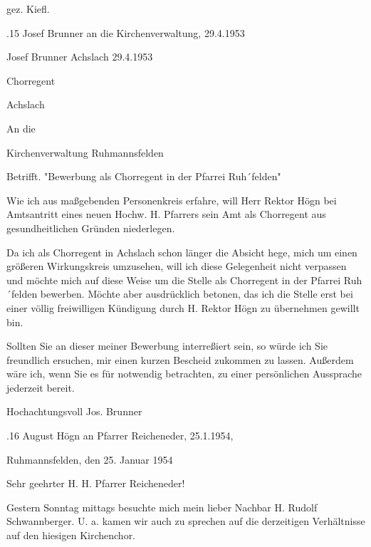 \documentclass[12pt,a4pager]{book}
\begin{document}
gez. Kiefl.

.15 Josef Brunner an die Kirchenverwaltung, 29.4.1953

Josef Brunner                   Achslach 29.4.1953

Chorregent

Achslach



An die

Kirchenverwaltung Ruhmannsfelden



Betrifft. "Bewerbung als Chorregent in der Pfarrei Ruh´felden"



Wie ich aus maßgebenden Personenkreis erfahre, will Herr Rektor Högn bei
Amtsantritt eines neuen Hochw. H. Pfarrers sein Amt als Chorregent aus
gesundheitlichen Gründen niederlegen.

Da ich als Chorregent in Achslach schon länger die Absicht hege, mich um einen
größeren Wirkungskreis umzusehen, will ich diese Gelegenheit nicht verpassen und
möchte mich auf diese Weise um die Stelle als Chorregent in der Pfarrei
Ruh´felden bewerben. Möchte aber ausdrücklich betonen, das ich die Stelle erst
bei einer völlig freiwilligen Kündigung durch H. Rektor Högn zu übernehmen
gewillt bin.

Sollten Sie an dieser meiner Bewerbung interreßiert sein, so würde ich Sie
freundlich ersuchen, mir einen kurzen Bescheid zukommen zu lassen. Außerdem wäre
ich, wenn Sie es für notwendig betrachten, zu einer persönlichen Aussprache
jederzeit bereit.



Hochachtungsvoll Jos. Brunner

.16 August Högn an Pfarrer Reicheneder, 25.1.1954,

Ruhmannsfelden, den 25. Januar 1954



Sehr geehrter H. H. Pfarrer Reicheneder!



Gestern Sonntag mittags besuchte mich mein lieber Nachbar H. Rudolf
Schwannberger. U. a. kamen wir auch zu sprechen auf die derzeitigen Verhältnisse
auf den hiesigen Kirchenchor.
\end{document}

